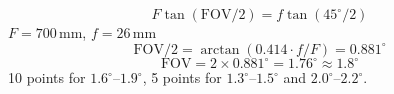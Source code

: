 \[ F \tan(\mathrm{FOV}/2) = f \tan(45^\circ/2) \]
$F = 700$\,mm, $f = 26$\,mm
\[ \mathrm{FOV}/2 = \arctan(0.414 \cdot f/F) = 0.881^\circ \]
\[ \mathrm{FOV} = 2 \times 0.881^\circ = 1.76^\circ \approx 1.8^\circ \]
10 points for $1.6^\circ$--$1.9^\circ$, 5 points for $1.3^\circ$--$1.5^\circ$
and $2.0^\circ$--$2.2^\circ$.
